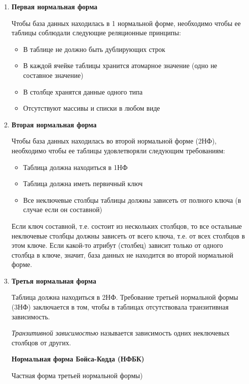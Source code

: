 \begin{enumerate}
    \item \textbf{Первая нормальная форма}

    Чтобы база данных находилась в 1 нормальной форме, необходимо чтобы ее таблицы соблюдали следующие реляционные принципы:

    \begin{itemize}
	    \item В таблице не должно быть дублирующих строк
	    \item В каждой ячейке таблицы хранится атомарное значение (одно не составное значение)
	    \item В столбце хранятся данные одного типа
	    \item Отсутствуют массивы и списки в любом виде
    \end{itemize}

    \item  \textbf{Вторая нормальная форма}

    Чтобы база данных находилась во второй нормальной форме (2НФ), необходимо чтобы ее таблицы удовлетворяли следующим требованиям:

    \begin{itemize}
	    \item Таблица должна находиться в 1НФ
    	\item Таблица должна иметь первичный ключ
	    \item Все неключевые столбцы таблицы должны зависеть от полного ключа (в случае если он составной)
    \end{itemize}

    Если ключ составной, т.е. состоит из нескольких столбцов, то все остальные неключевые столбцы должны зависеть от всего ключа, т.е. от всех столбцов в этом ключе. Если какой-то атрибут (столбец) зависит только от одного столбца в ключе, значит, база данных не находится во второй нормальной форме.

    \item \textbf{Третья нормальная форма}

    Таблица должна находиться в 2НФ. Требование третьей нормальной формы (3НФ) заключается в том, чтобы в таблицах отсутствовала транзитивная зависимость.

    \textit{Транзитивной зависимостью} называется зависимость одних неключевых столбцов от других.

    \textbf{Нормальная форма Бойса-Кодда (НФБК)} 

    Частная форма третьей нормальной формы)


\end{enumerate}
